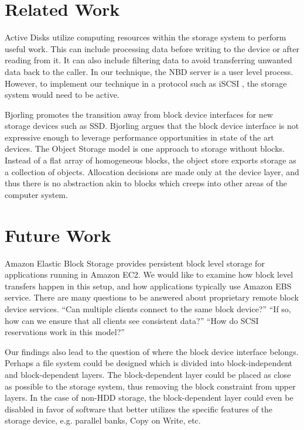 \documentclass[10pt,twocolumn]{article}
\begin{document}
  
\section{Related Work}
\label{sec:related}

Active Disks \cite{acharya98, riedel97, boboila12} utilize computing
resources within the storage system to perform useful work. %
This can include processing data before writing to the device or after reading
from it. %
It can also include filtering data to avoid transferring unwanted data back to
the caller. %
In our technique, the NBD server is a user level process. %
However, to implement our technique in a protocol such as iSCSI \cite{satran04}, the
storage system would need to be active. %

Bjorling promotes the transition away from block device interfaces for new
storage devices such as SSD\cite{bjorling13}. %
Bjorling argues that the block device interface is not expressive enough to
leverage performance opportunities in state of the art devices. %
The Object Storage model \cite{factor05} is one approach to storage without
blocks. %
Instead of a flat array of homogeneous blocks, the object store exports storage
as a collection of objects. %
Allocation decisions are made only at the device layer, and thus there is no
abstraction akin to blocks which creeps into other areas of the computer system. %

\section{Future Work}
\label{sec:future}
Amazon Elastic Block Storage \cite{amazon} provides persistent block level
storage for applications running in Amazon EC2. %
We would like to examine how block level transfers happen in this setup, and how
applications typically use Amazon EBS service. %
There are many questions to be answered about proprietary remote block device
services. %
``Can multiple clients connect to the same block device?'' %
``If so, how can we ensure that all clients see consistent data?'' %
``How do SCSI reservations work in this model?'' %

Our findings also lead to the question of where the block device interface
belongs. %
Perhaps a file system could be designed which is divided into block-independent
and block-dependent layers. %
The block-dependent layer could be placed as close as possible to the storage
system, thus removing the block constraint from upper layers. %
In the case of non-HDD storage, the block-dependent layer could even be disabled
in favor of software that better utilizes the specific features of the storage
device, e.g. parallel banks, Copy on Write, etc. %
\end{document}
